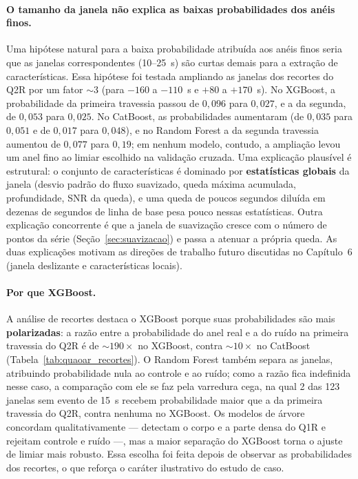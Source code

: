 \paragraph{O tamanho da janela não explica as baixas probabilidades dos anéis finos.} Uma hipótese natural para a baixa probabilidade atribuída aos anéis finos seria que as janelas correspondentes (10--25~s) são curtas demais para a extração de características. Essa hipótese foi testada ampliando as janelas dos recortes do Q2R por um fator $\sim 3$ (para $-160$ a $-110$~s e $+80$ a $+170$~s). No XGBoost, a probabilidade da primeira travessia passou de $0{,}096$ para $0{,}027$, e a da segunda, de $0{,}053$ para $0{,}025$. No CatBoost, as probabilidades aumentaram (de $0{,}035$ para $0{,}051$ e de $0{,}017$ para $0{,}048$), e no Random Forest a da segunda travessia aumentou de $0{,}077$ para $0{,}19$; em nenhum modelo, contudo, a ampliação levou um anel fino ao limiar escolhido na validação cruzada. Uma explicação plausível é estrutural: o conjunto de características é dominado por \textbf{estatísticas globais} da janela (desvio padrão do fluxo suavizado, queda máxima acumulada, profundidade, SNR da queda), e uma queda de poucos segundos diluída em dezenas de segundos de linha de base pesa pouco nessas estatísticas. Outra explicação concorrente é que a janela de suavização cresce com o número de pontos da série (Seção~\ref{sec:suavizacao}) e passa a atenuar a própria queda. As duas explicações motivam as direções de trabalho futuro discutidas no Capítulo~6 (janela deslizante e características locais).

\paragraph{Por que XGBoost.} A análise de recortes destaca o XGBoost porque suas probabilidades são mais \textbf{polarizadas}: a razão entre a probabilidade do anel real e a do ruído na primeira travessia do Q2R é de $\sim 190\times$ no XGBoost, contra $\sim 10\times$ no CatBoost (Tabela~\ref{tab:quaoar_recortes}). O Random Forest também separa as janelas, atribuindo probabilidade nula ao controle e ao ruído; como a razão fica indefinida nesse caso, a comparação com ele se faz pela varredura cega, na qual 2 das 123 janelas sem evento de 15~s recebem probabilidade maior que a da primeira travessia do Q2R, contra nenhuma no XGBoost. Os modelos de árvore concordam qualitativamente --- detectam o corpo e a parte densa do Q1R e rejeitam controle e ruído ---, mas a maior separação do XGBoost torna o ajuste de limiar mais robusto. Essa escolha foi feita depois de observar as probabilidades dos recortes, o que reforça o caráter ilustrativo do estudo de caso.


